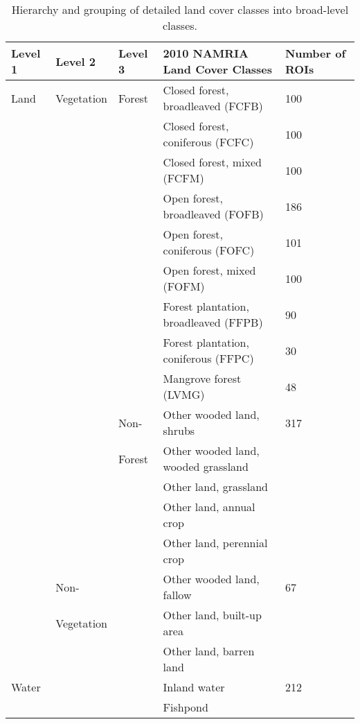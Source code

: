 \begin{spacing}{1.0}
\begin{longtable}[h!]{ p{1.4cm} p{1.8cm} p{1.4cm} p{6.9cm} p{1.5cm} }

    \caption[Hierarchy and grouping of land cover from detailed to broad-level classes.]{Hierarchy and grouping of detailed land cover classes into broad-level classes.}
    \label{tab: method-table3.1}\\
    
    	\toprule
    	Level 1 & Level 2 & Level 3 & 2010 NAMRIA Land Cover Classes & Number of ROIs\\ 
    	\midrule
    	\endhead
    	
		Land & Vegetation & Forest & Closed forest, broadleaved (FCFB) & 100\\
		{} & {} & {} & Closed forest, coniferous (FCFC) & 100\\
		{} & {} & {} & Closed forest, mixed (FCFM) & 100\\
		{} & {} & {} & Open forest, broadleaved (FOFB) & 186\\
		{} & {} & {} & Open forest, coniferous (FOFC) & 101\\
		{} & {} & {} & Open forest, mixed (FOFM) & 100\\
		{} & {} & {} & Forest plantation, broadleaved (FFPB) & 90\\
		{} & {} & {} & Forest plantation, coniferous (FFPC) & 30\\
		{} & {} & {} & Mangrove forest (LVMG) & 48\\[2pt]
		\cmidrule{3-5}
		{} & {} & Non- & Other wooded land, shrubs & 317\\
		{} & {} & Forest & Other wooded land, wooded grassland & {}\\
		{} & {} & {} & Other land, grassland & {}\\
		{} & {} & {} & Other land, annual crop & {}\\
		{} & {} & {} & Other land, perennial crop & {}\\[5pt]
		\cmidrule{2-5}
		{} & Non- & {} & Other wooded land, fallow & 67\\
		{} & Vegetation & {} & Other land, built-up area & {}\\
		{} & {} & {} & Other land, barren land & {}\\[5pt]
		\cmidrule{1-5}
		Water & {} & {} & Inland water & 212\\
		{} & {} & {} & Fishpond & {}\\
		\bottomrule
    
\end{longtable}
\end{spacing}

